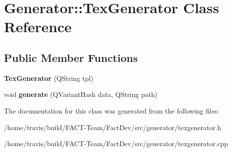 \hypertarget{classGenerator_1_1TexGenerator}{\section{Generator\-:\-:Tex\-Generator Class Reference}
\label{classGenerator_1_1TexGenerator}
}
\subsection*{Public Member Functions}
\begin{DoxyCompactItemize}
\item 
\hypertarget{classGenerator_1_1TexGenerator_ade851f7c789f66769bbdace3c4a37eef}{{\bfseries Tex\-Generator} (Q\-String tpl)}\label{classGenerator_1_1TexGenerator_ade851f7c789f66769bbdace3c4a37eef}

\item 
\hypertarget{classGenerator_1_1TexGenerator_a5862fde82e703176d1cdaa33d3ac3db5}{void {\bfseries generate} (Q\-Variant\-Hash data, Q\-String path)}\label{classGenerator_1_1TexGenerator_a5862fde82e703176d1cdaa33d3ac3db5}

\end{DoxyCompactItemize}


The documentation for this class was generated from the following files\-:\begin{DoxyCompactItemize}
\item 
/home/travis/build/\-F\-A\-C\-T-\/\-Team/\-Fact\-Dev/src/generator/texgenerator.\-h\item 
/home/travis/build/\-F\-A\-C\-T-\/\-Team/\-Fact\-Dev/src/generator/texgenerator.\-cpp\end{DoxyCompactItemize}
